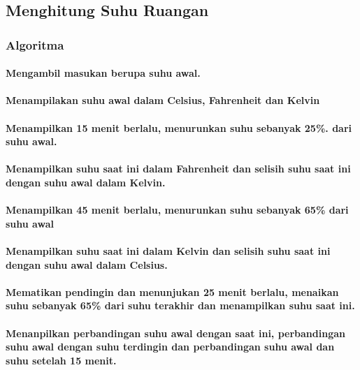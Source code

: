 \documentclass[../main.tex]{subfiles}
\begin{document}
    \subsection{Menghitung Suhu Ruangan}
    \subsubsection{Algoritma}
    \paragraph{Mengambil masukan berupa suhu awal.}
    \paragraph{Menampilakan suhu awal dalam Celsius, Fahrenheit dan Kelvin}
    \paragraph{Menampilkan 15 menit berlalu, menurunkan suhu sebanyak 25\%. dari suhu awal.}
    \paragraph{Menampilkan suhu saat ini dalam Fahrenheit dan selisih suhu saat ini dengan suhu awal dalam Kelvin.}
    \paragraph{Menampilkan 45 menit berlalu, menurunkan suhu sebanyak 65\% dari suhu awal}
    \paragraph{Menampilkan suhu saat ini dalam Kelvin dan selisih suhu saat ini dengan suhu awal dalam Celsius.}
    \paragraph{Mematikan pendingin dan menunjukan 25 menit berlalu, menaikan suhu sebanyak 65\% dari suhu terakhir dan menampilkan suhu saat ini.}
    \paragraph{Menanpilkan perbandingan suhu awal dengan saat ini, perbandingan suhu awal dengan suhu terdingin dan perbandingan suhu awal dan suhu setelah 15 menit.}

    \subsubsection{{\Pseudocode}}
    \begin{indentlevel0}
        
    \end{indentlevel0}
\end{document}
